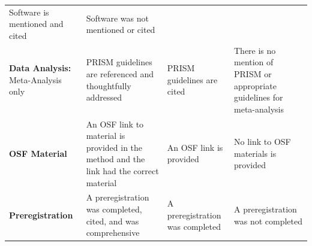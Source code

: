 \documentclass[
  openany]{book}
\begin{document}
\begin{longtable}[]{@{}llll@{}}
\begin{minipage}[t]{0.22\columnwidth}
Software is mentioned and cited\strut
\end{minipage} & \begin{minipage}[t]{0.22\columnwidth}\raggedright
Software was not mentioned or cited\strut
\end{minipage}\tabularnewline
\begin{minipage}[t]{0.22\columnwidth}\raggedright
\textbf{Data Analysis:} Meta-Analysis only\strut
\end{minipage} & \begin{minipage}[t]{0.22\columnwidth}\raggedright
PRISM guidelines are referenced and thoughtfully addressed\strut
\end{minipage} & \begin{minipage}[t]{0.22\columnwidth}\raggedright
PRISM guidelines are cited\strut
\end{minipage} & \begin{minipage}[t]{0.22\columnwidth}\raggedright
There is no mention of PRISM or appropriate guidelines for meta-analysis\strut
\end{minipage}\tabularnewline
\begin{minipage}[t]{0.22\columnwidth}\raggedright
\textbf{OSF Material}\strut
\end{minipage} & \begin{minipage}[t]{0.22\columnwidth}\raggedright
An OSF link to material is provided in the method and the link had the correct material\strut
\end{minipage} & \begin{minipage}[t]{0.22\columnwidth}\raggedright
An OSF link is provided\strut
\end{minipage} & \begin{minipage}[t]{0.22\columnwidth}\raggedright
No link to OSF materials is provided\strut
\end{minipage}\tabularnewline
\begin{minipage}[t]{0.22\columnwidth}\raggedright
\textbf{Preregistration}\strut
\end{minipage} & \begin{minipage}[t]{0.22\columnwidth}\raggedright
A preregistration was completed, cited, and was comprehensive\strut
\end{minipage} & \begin{minipage}[t]{0.22\columnwidth}\raggedright
A preregistration was completed\strut
\end{minipage} & \begin{minipage}[t]{0.22\columnwidth}\raggedright
A preregistration was not completed\strut

\end{minipage}
\end{longtable}
\end{document}
